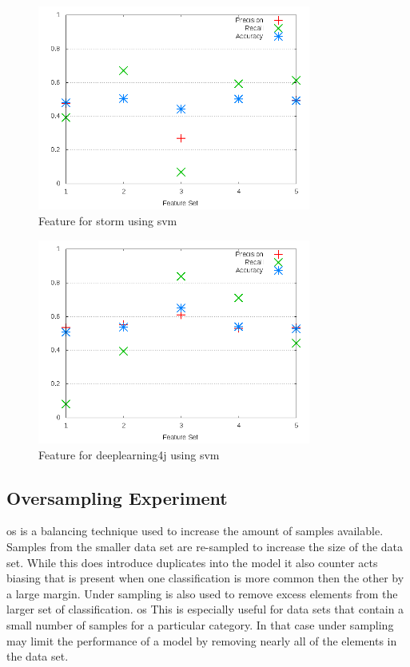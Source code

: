 \begin{figure}[!h]
    \centering
        \includegraphics[width=0.8\textwidth]{images/svm/test_3/storm_sample_range}
        \caption{Feature for storm using \gls{svm}}
        \label{fig:test_3_storm_svm}
\end{figure}

\begin{figure}[!h]
    \centering
        \includegraphics[width=0.8\textwidth]{images/svm/test_3/deeplearning4j_sample_range}
    \caption{Feature for deeplearning4j using \gls{svm}}
    \label{fig:test_3_deeplearning4j_svm}
\end{figure}

\subsection{Oversampling Experiment}

\gls{os} is a balancing technique used to increase the amount of samples available. Samples from the smaller data set are re-sampled to increase the size of the data set. While this does introduce duplicates into the model it also counter acts biasing that is present when one classification is more common then the other by a large margin. Under sampling is also used to remove excess elements from the larger set of classification. \gls{os} This is especially useful for data sets that contain a small number of samples for a particular category. In that case under sampling may limit the performance of a model by removing nearly all of the elements in the data set.

